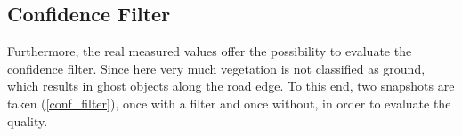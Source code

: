 \documentclass[11pt,oneside,openright]{mpreport}
\begin{document}
\subsection{Confidence Filter}
Furthermore, the real measured values offer the possibility to evaluate the confidence filter.
Since here very much vegetation is not classified as ground, which results in ghost objects along the road edge.
To this end, two snapshots are taken (\cref{conf_filter}), once with a filter and once without, in order to evaluate the quality.
\end{document}

